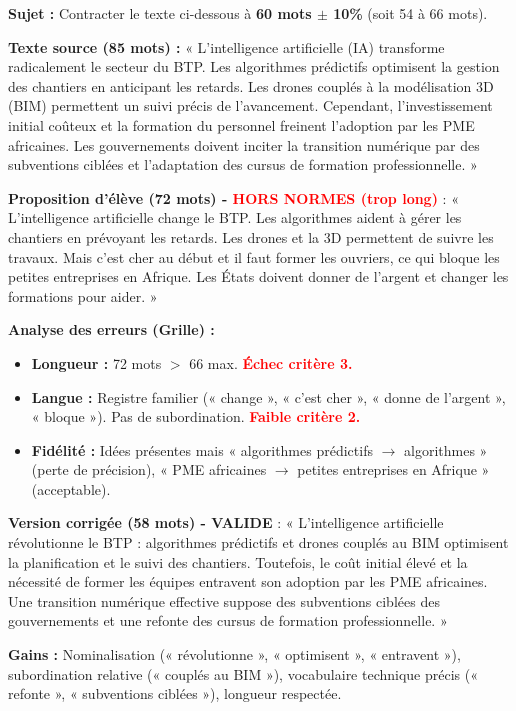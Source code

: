 \documentclass[11pt]{article}
\begin{document}
\begin{exoresolu}
\textbf{Sujet :} Contracter le texte ci-dessous à \textbf{60 mots $\pm$ 10\%} (soit 54 à 66 mots).

\textbf{Texte source (85 mots) :}
« L'intelligence artificielle (IA) transforme radicalement le secteur du BTP. Les algorithmes prédictifs optimisent la gestion des chantiers en anticipant les retards. Les drones couplés à la modélisation 3D (BIM) permettent un suivi précis de l'avancement. Cependant, l'investissement initial coûteux et la formation du personnel freinent l'adoption par les PME africaines. Les gouvernements doivent inciter la transition numérique par des subventions ciblées et l'adaptation des cursus de formation professionnelle. »

\textbf{Proposition d'élève (72 mots) - \textcolor{red}{HORS NORMES (trop long)}} :
« L'intelligence artificielle change le BTP. Les algorithmes aident à gérer les chantiers en prévoyant les retards. Les drones et la 3D permettent de suivre les travaux. Mais c'est cher au début et il faut former les ouvriers, ce qui bloque les petites entreprises en Afrique. Les États doivent donner de l'argent et changer les formations pour aider. »

\textbf{Analyse des erreurs (Grille) :}
\begin{itemize}
    \item \textbf{Longueur :} 72 mots $>$ 66 max. \textbf{\textcolor{red}{Échec critère 3.}}
    \item \textbf{Langue :} Registre familier (« change », « c'est cher », « donne de l'argent », « bloque »). Pas de subordination. \textbf{\textcolor{red}{Faible critère 2.}}
    \item \textbf{Fidélité :} Idées présentes mais « algorithmes prédictifs $\rightarrow$ algorithmes » (perte de précision), « PME africaines $\rightarrow$ petites entreprises en Afrique » (acceptable).
\end{itemize}

\textbf{Version corrigée (58 mots) - \textcolor{popgreen}{VALIDE}} :
« L'intelligence artificielle révolutionne le BTP : algorithmes prédictifs et drones couplés au BIM optimisent la planification et le suivi des chantiers. Toutefois, le coût initial élevé et la nécessité de former les équipes entravent son adoption par les PME africaines. Une transition numérique effective suppose des subventions ciblées des gouvernements et une refonte des cursus de formation professionnelle. »

\textbf{Gains :} Nominalisation (« révolutionne », « optimisent », « entravent »), subordination relative (« couplés au BIM »), vocabulaire technique précis (« refonte », « subventions ciblées »), longueur respectée.
\end{exoresolu}
\end{document}
